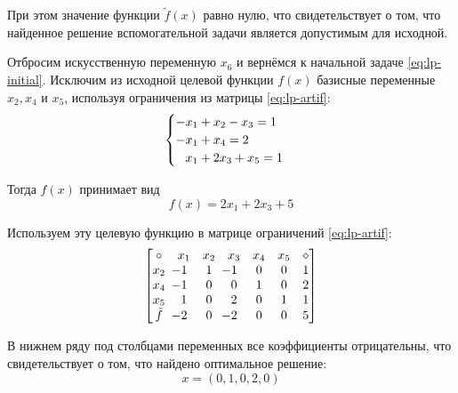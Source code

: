 При этом значение функции $\tilde{f}(x)$ равно нулю, что свидетельствует
о том, что найденное решение вспомогательной задачи является
допустимым для исходной.

Отбросим искусственную переменную $x_6$ и вернёмся к начальной задаче
\eqref{eq:lp-initial}. Исключим из исходной целевой функции $f(x)$
базисные переменные $x_2, x_4$ и $x_5$, используя ограничения из
матрицы \eqref{eq:lp-artif}:
\begin{equation*}
  \begin{cases}
    -x_1+x_2-x_3=1\\
    -x_1+x_4=2\\
    \phm x_1+2x_3+x_5 = 1
  \end{cases}
\end{equation*}

Тогда $f(x)$ принимает вид
\begin{equation*}
  f(x) = 2x_1+2x_3+5
\end{equation*}

Используем эту целевую функцию в матрице ограничений \eqref{eq:lp-artif}:
\begin{equation*}
  \begin{bmatrix}
    \circ & x_1 & x_2 & x_3 & x_4 & x_5 & \diamond\\
    x_2 &\mm{1}& 1 &\mm{1}& 0 & 0 & 1\\
    x_4 &\mm{1}& 0 &  0 & 1 & 0 & 2\\
    x_5 &  1 & 0 &  2 & 0 & 1 & 1\\
    \tilde{f} & \mm{2} & 0 & \mm{2} & 0 & 0 & 5
  \end{bmatrix}
\end{equation*}

В нижнем ряду под столбцами переменных все коэффициенты отрицательны,
что свидетельствует о том, что найдено оптимальное решение:
\begin{equation*}
  x = (0, 1, 0, 2, 0)
\end{equation*}

